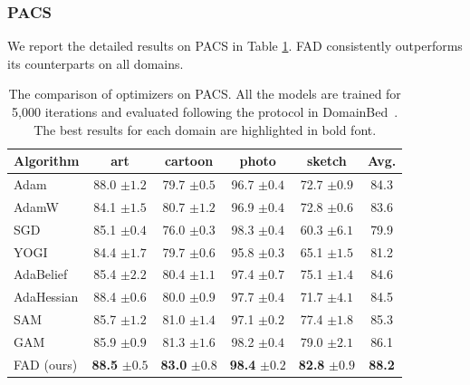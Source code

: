 \subsubsection{PACS}
We report the detailed results on PACS in Table \ref{tab:pacs5k}. FAD consistently outperforms its counterparts on all domains.
\begin{table}[th]
\centering
\caption{The comparison of optimizers on PACS. All the models are trained for 5,000 iterations and evaluated following the protocol in DomainBed~\cite{gulrajani2020search}. The best results for each domain are highlighted in bold font.}
\begin{tabular}{lcccc|c}
\toprule
\textbf{Algorithm} & art & cartoon & photo & sketch  & \textbf{Avg.} \\
\midrule

Adam  & 88.0 \footnotesize{$\pm 1.2$} &  79.7 \footnotesize{$\pm 0.5$} & 96.7 \footnotesize{$\pm 0.4$} & 72.7 \footnotesize{$\pm 0.9$} & 84.3 \\
AdamW  & 84.1 \footnotesize{$\pm 1.5$} & 80.7 \footnotesize{$\pm 1.2$}  & 96.9 \footnotesize{$\pm 0.4$} & 72.8 \footnotesize{$\pm 0.6$} & 83.6 \\
SGD  & 85.1 \footnotesize{$\pm 0.4$} & 76.0 \footnotesize{$\pm 0.3$}  & 98.3 \footnotesize{$\pm 0.4$} & 60.3 \footnotesize{$\pm 6.1$} & 79.9 \\
YOGI  & 84.4 \footnotesize{$\pm 1.7$} & 79.7 \footnotesize{$\pm 0.6$}  & 95.8 \footnotesize{$\pm 0.3$} & 65.1 \footnotesize{$\pm 1.5$} & 81.2 \\
AdaBelief  & 85.4 \footnotesize{$\pm 2.2$} & 80.4 \footnotesize{$\pm 1.1$}  & 97.4 \footnotesize{$\pm 0.7$} & 75.1 \footnotesize{$\pm 1.4$} & 84.6\\
AdaHessian  & 88.4 \footnotesize{$\pm 0.6$} &  80.0 \footnotesize{$\pm 0.9$} & 97.7 \footnotesize{$\pm 0.4$} & 71.7 \footnotesize{$\pm 4.1$} & 84.5 \\
SAM  & 85.7 \footnotesize{$\pm 1.2$} & 81.0 \footnotesize{$\pm 1.4$}  & 97.1 \footnotesize{$\pm 0.2$} & 77.4 \footnotesize{$\pm 1.8$} & 85.3 \\
GAM  & 85.9 \footnotesize{$\pm 0.9$} & 81.3 \footnotesize{$\pm 1.6$}  & 98.2 \footnotesize{$\pm 0.4$} & 79.0 \footnotesize{$\pm 2.1$} & 86.1 \\
\midrule
FAD (ours)  & \textbf{88.5} \footnotesize{$\pm 0.5$} & \textbf{83.0} \footnotesize{$\pm 0.8$}  & \textbf{98.4} \footnotesize{$\pm 0.2$} & \textbf{82.8} \footnotesize{$\pm 0.9$} & \textbf{88.2} \\

\bottomrule
\end{tabular}
\label{tab:pacs5k}
\end{table}


